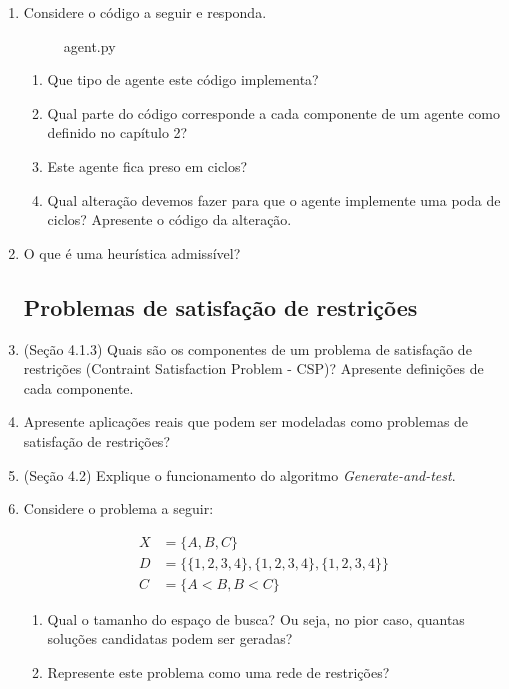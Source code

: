 \documentclass{article}
\begin{document}
\begin{enumerate}
\begin{enumerate}
    \end{enumerate} 

\item Considere o código a seguir e responda.

\begin{figure}[!ht]
    
    \caption{agent.py}
\end{figure}

\begin{enumerate}
    \item Que tipo de agente este código implementa?
    \item Qual parte do código corresponde a cada componente de um agente como definido no capítulo 2?
    \item Este agente fica preso em ciclos?
    \item Qual alteração devemos fazer para que o agente implemente uma poda de ciclos? Apresente o código da alteração. 
\end{enumerate}

\item O que é uma heurística admissível?

\subsection{Problemas de satisfação de restrições}

\item (Seção 4.1.3) Quais são os componentes de um problema de satisfação de restrições (Contraint Satisfaction Problem - CSP)? Apresente definições de cada componente.

\item Apresente aplicações reais que podem ser modeladas como problemas de satisfação de restrições?

\item (Seção 4.2) Explique o funcionamento do algoritmo \textit{Generate-and-test}.

\item Considere o problema a seguir:

\begin{align*}
    X &= \{A,B,C\} \\
    D &= \{\{1,2,3,4\},\{1,2,3,4\},\{1,2,3,4\} \}\\
    C &= \{ A < B, B < C \}    
\end{align*}

\begin{enumerate}
    \item Qual o tamanho do espaço de busca? Ou seja, no pior caso, quantas soluções candidatas podem ser geradas?
    \item Represente este problema como uma rede de restrições?
\end{enumerate}


\end{enumerate}
\end{document}
